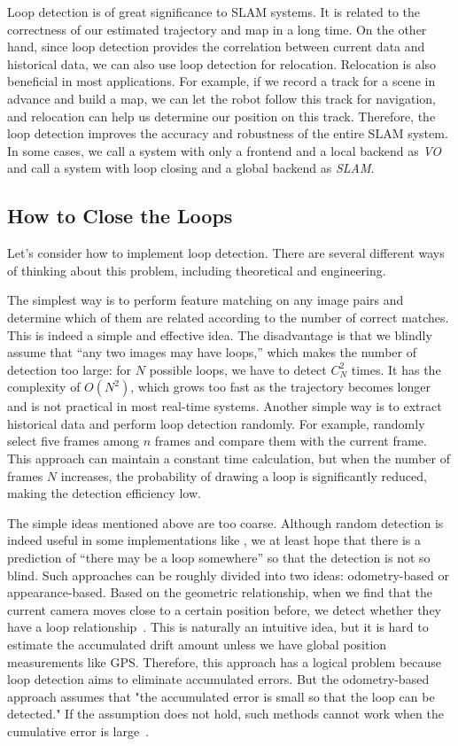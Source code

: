 Loop detection is of great significance to SLAM systems. It is related to the correctness of our estimated trajectory and map in a long time. On the other hand, since loop detection provides the correlation between current data and historical data, we can also use loop detection for relocation. Relocation is also beneficial in most applications. For example, if we record a track for a scene in advance and build a map, we can let the robot follow this track for navigation, and relocation can help us determine our position on this track. Therefore, the loop detection improves the accuracy and robustness of the entire SLAM system. In some cases, we call a system with only a frontend and a local backend as \textit{VO} and call a system with loop closing and a global backend as \textit{SLAM}.

\subsection{How to Close the Loops}
Let's consider how to implement loop detection. There are several different ways of thinking about this problem, including theoretical and engineering.


The simplest way is to perform feature matching on any image pairs and determine which of them are related according to the number of correct matches. This is indeed a simple and effective idea. The disadvantage is that we blindly assume that ``any two images may have loops,'' which makes the number of detection too large: for $N$ possible loops, we have to detect $C_N^2$ times. It has the complexity of $O(N^2)$, which grows too fast as the trajectory becomes longer and is not practical in most real-time systems. Another simple way is to extract historical data and perform loop detection randomly. For example, randomly select five frames among $n$ frames and compare them with the current frame. This approach can maintain a constant time calculation, but when the number of frames $N$ increases, the probability of drawing a loop is significantly reduced, making the detection efficiency low.

The simple ideas mentioned above are too coarse. Although random detection is indeed useful in some implementations like {\cite{Endres2014}}, we at least hope that there is a prediction of ``there may be a loop somewhere'' so that the detection is not so blind. Such approaches can be roughly divided into two ideas: odometry-based or appearance-based. Based on the geometric relationship, when we find that the current camera moves close to a certain position before, we detect whether they have a loop relationship~\cite{Hahnel2003}. This is naturally an intuitive idea, but it is hard to estimate the accumulated drift amount unless we have global position measurements like GPS. Therefore, this approach has a logical problem because loop detection aims to eliminate accumulated errors. But the odometry-based approach assumes that "the accumulated error is small so that the loop can be detected." If the assumption does not hold, such methods cannot work when the cumulative error is large~\cite{Beeson2010}.

